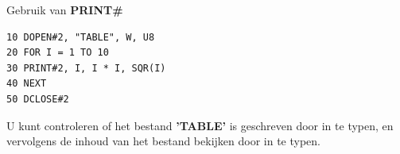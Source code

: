 \begin{description}[leftmargin=2cm,style=nextline]
\item [Voorbeeld:]  Gebruik van {\bf PRINT\#}

\begin{tcolorbox}[colback=black,coltext=white]
\verbatimfont{\codefont}
\begin{verbatim}
10 DOPEN#2, "TABLE", W, U8
20 FOR I = 1 TO 10
30 PRINT#2, I, I * I, SQR(I)
40 NEXT
50 DCLOSE#2
\end{verbatim}
\end{tcolorbox}

                  U kunt controleren of het bestand {\bf 'TABLE'} is geschreven door  in te typen, en vervolgens de inhoud van het bestand bekijken door  in te typen.

\end{description}


\newpage
